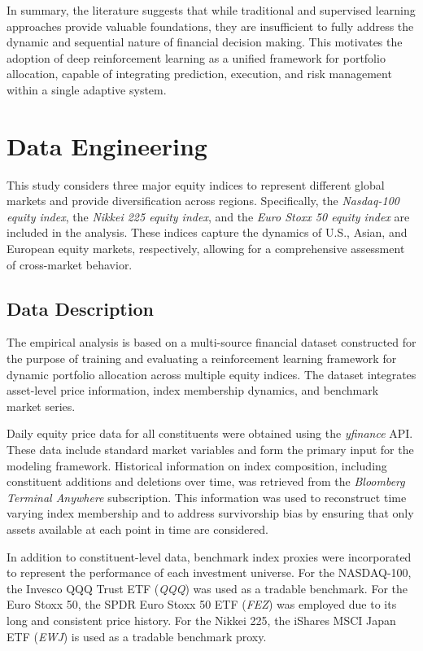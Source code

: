 \documentclass[]{elsarticle}
\begin{document}
In summary, the literature suggests that while traditional and supervised learning approaches provide valuable foundations, they are insufficient to fully address the dynamic and sequential nature of financial decision making. This motivates the adoption of deep reinforcement learning as a unified framework for portfolio allocation, capable of integrating prediction, execution, and risk management within a single adaptive system.

\hypertarget{data}{%
\section{Data Engineering}\label{data}}

This study considers three major equity indices to represent different global markets and provide diversification across regions. Specifically, the \textit{Nasdaq-100 equity index}, the \textit{Nikkei 225 equity index}, and the \textit{Euro Stoxx 50 equity index} are included in the analysis. These indices capture the dynamics of  U.S., Asian, and European equity markets, respectively, allowing for a comprehensive assessment of cross-market behavior. 

\hypertarget{data_description}{%
\subsection{Data Description}\label{data_description}}

The empirical analysis is based on a multi-source financial dataset constructed for the purpose of training and evaluating a reinforcement learning framework for dynamic portfolio allocation across multiple equity indices. The dataset integrates asset-level price information, index membership dynamics, and benchmark market series.

Daily equity price data for all constituents were obtained using the \textit{yfinance} API. These data include standard market variables and form the primary input for the modeling framework. Historical information on index composition, including constituent additions and deletions over time, was retrieved from the \textit{Bloomberg Terminal Anywhere} subscription. This information was used to reconstruct time varying index membership and to address survivorship bias by ensuring that only assets available at each point in time are considered.

In addition to constituent-level data, benchmark index proxies were incorporated to represent the performance of each investment universe. For the NASDAQ-100, the Invesco QQQ Trust ETF (\textit{QQQ}) was used as a tradable benchmark. For the Euro Stoxx 50, the SPDR Euro Stoxx 50 ETF (\textit{FEZ}) was employed due to its long and consistent price history. For the Nikkei 225, the iShares MSCI Japan ETF (\textit{EWJ}) is used as a tradable benchmark proxy. 
\end{document}

